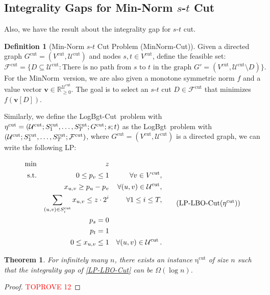 \documentclass[11pt,a4paper]{article} \usepackage{enumitem}
\newcommand{\assigned}[1]{[ #1 ]}
\newcommand{\calF}{\mathcal{F}}
\newcommand{\calU}{\mathcal{U}}
\newcommand{\boldv}{\boldsymbol{v}}
\newcommand{\minnorm}{\textsf{MinNorm}}
\newcommand{\LBO}{\textsf{LogBgt}}
\newcommand{\minnormcut}{\textsf{MinNorm-Cut}}
\newcommand{\LBOcut}{\textsf{LogBgt-Cut}}
\newcommand{\cutU}{\operatorname{\calU^{cut}}}
\newcommand{\cutS}[1]{\ifx\relax#1\relax
    S^{\operatorname{cut}} \else
    S^{\operatorname{cut}}_{#1} \fi
}
\newcommand{\cutF}{\operatorname{\calF^{cut}}}
\newcommand{\cuteta}{\operatorname{\eta^{cut}}}
\newcommand{\cutG}{G^{\operatorname{cut}}}
\newcommand{\cutV}{V^{\operatorname{cut}}}
\newtheorem{theorem}{Theorem}[section]
\theoremstyle{definition}
\newtheorem{definition}{Definition}[section]
\begin{document}
 
\subsection{Integrality Gaps for Min-Norm $s$-$t$ Cut} 
Also, we have the result about the integrality gap for $s$-$t$ cut.
\begin{definition}[Min-Norm $s$-$t$ Cut Problem (\minnormcut)]
Given a directed graph $\cutG = (\cutV, \cutU)$ and nodes $s, t \in \cutV$, define the feasible set:
$$
\cutF = \{D \subseteq \cutU : \text{There is no path from } s \text{ to } t \text{ in the graph } G' = (\cutV, \cutU \setminus D)\}.
$$
For the \minnorm\ version, we are also given a monotone symmetric norm $f$ and a value vector $\boldv \in \mathbb{R}_{\geq 0}^{\cutU}$. The goal is to select an $s$-$t$ cut $D \in \cutF$ that minimizes $f(\boldv\assigned{D})$.
\end{definition}

Similarly, we define the \LBOcut\ problem with $\cuteta = (\cutU; \cutS{1}, \ldots, \cutS{T}; \cutG; s; t)$ as the \LBO\ problem with $(\cutU; \cutS{1}, \ldots, \cutS{T}; \cutF)$, where $\cutG = (\cutV, \cutU)$ is a directed graph, we can write the following LP:

\begin{equation}
\begin{aligned}
    \min && z && \\
    \text{s.t.} && 0 \leq p_v \leq 1 && \forall v \in \cutV,\\
    && x_{u, v} \geq p_u - p_v && \forall (u, v) \in \cutU,\\
    && \sum_{(u, v) \in \cutS{i}} x_{u, v} \leq z \cdot 2^{i} && \forall 1 \leq i \leq T,\\
    && p_s = 0 && \\
    && p_t = 1 && \\
    && 0 \leq x_{u, v} \leq 1 && \forall (u, v) \in \cutU.
\end{aligned}
\tag{LP-LBO-Cut($\cuteta$)}
\label{LP-LBO-Cut}
\end{equation}

\begin{theorem}\label{thm:intgap-2}
For infinitely many $n$, there exists an instance $\cuteta$ of size $n$ such that the integrality gap of \cref{LP-LBO-Cut} can be $\Omega(\log n)$. 
\end{theorem}

\begin{proof}\textcolor{red}{TOPROVE 12}\end{proof}
\end{document}
